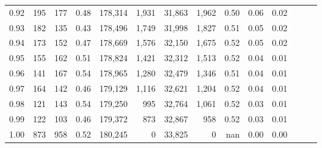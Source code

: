 \begin{tabular}{rrrrrrrrrrrrrr}
0.92 &    195 &  177 &  0.48 &  178,314 &    1,931 &  31,863 &   1,962 &  0.50 &  0.06 &      0.02 \\
0.93 &    182 &  135 &  0.43 &  178,496 &    1,749 &  31,998 &   1,827 &  0.51 &  0.05 &      0.02 \\
0.94 &    173 &  152 &  0.47 &  178,669 &    1,576 &  32,150 &   1,675 &  0.52 &  0.05 &      0.02 \\
0.95 &    155 &  162 &  0.51 &  178,824 &    1,421 &  32,312 &   1,513 &  0.52 &  0.04 &      0.01 \\
0.96 &    141 &  167 &  0.54 &  178,965 &    1,280 &  32,479 &   1,346 &  0.51 &  0.04 &      0.01 \\
0.97 &    164 &  142 &  0.46 &  179,129 &    1,116 &  32,621 &   1,204 &  0.52 &  0.04 &      0.01 \\
0.98 &    121 &  143 &  0.54 &  179,250 &      995 &  32,764 &   1,061 &  0.52 &  0.03 &      0.01 \\
0.99 &    122 &  103 &  0.46 &  179,372 &      873 &  32,867 &     958 &  0.52 &  0.03 &      0.01 \\
1.00 &    873 &  958 &  0.52 &  180,245 &        0 &  33,825 &       0 &   nan &  0.00 &      0.00 \\
\bottomrule
\end{tabular}
